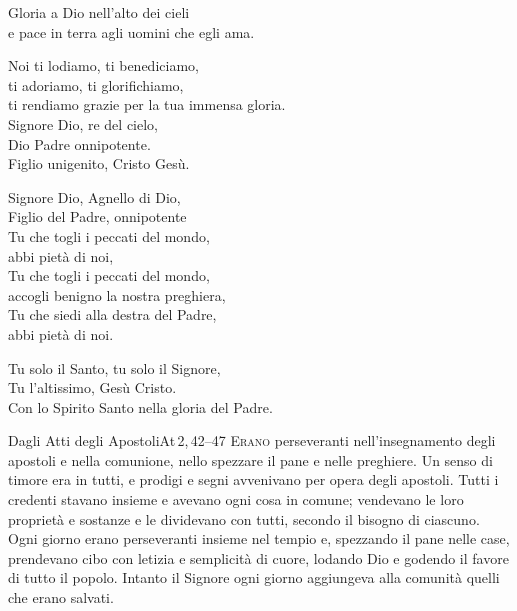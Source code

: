 \documentclass[11pt]{book}
\begin{document}
\vspace{-0.5\baselineskip}
\settowidth{\versewidth}{ti rendiamo grazie per la tua immensa gloria.}
\begin{canzone}%
\begin{ritornello}
Gloria a Dio nell'alto dei cieli\\
e pace in terra agli uomini che egli ama.
\end{ritornello}

Noi ti lodiamo, ti benediciamo,\\
ti adoriamo, ti glorifichiamo,\\
ti rendiamo grazie per la tua immensa gloria.\\
Signore Dio, re del cielo,\\
Dio Padre onnipotente.\\
Figlio unigenito, Cristo Gesù.

Signore Dio, Agnello di Dio,\\
Figlio del Padre, onnipotente\\
Tu che togli i peccati del mondo,\\
abbi pietà di noi,\\
Tu che togli i peccati del mondo,\\
accogli benigno la nostra preghiera,\\
Tu che siedi alla destra del Padre,\\
abbi pietà di noi.

Tu solo il Santo, tu solo il Signore,\\
Tu l'altissimo, Gesù Cristo.\\
Con lo Spirito Santo nella gloria del Padre.
\end{canzone}

\begin{lettura}{Dagli Atti degli Apostoli}{At\,2,\,42--47}
\lettrine[lines=3]{E}{rano} perseveranti nell'insegnamento degli apostoli e nella comunione, nello spezzare il pane e nelle preghiere. Un senso di timore era in tutti, e prodigi e segni avvenivano per opera degli apostoli. Tutti i credenti stavano insieme e avevano ogni cosa in comune; vendevano le loro proprietà e sostanze e le dividevano con tutti, secondo il bisogno di ciascuno. Ogni giorno erano perseveranti insieme nel tempio e, spezzando il pane nelle case, prendevano cibo con letizia e semplicità di cuore, lodando Dio e godendo il favore di tutto il popolo. Intanto il Signore ogni giorno aggiungeva alla comunità quelli che erano salvati.
\end{lettura}
\end{document}
